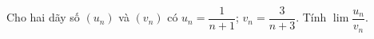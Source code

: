 \begin{ex}
Cho hai dãy số $(u_n)$ và $(v_n)$ có $u_n=\dfrac1{n+1}$; $v_n=\dfrac3{n+3}$. Tính $\lim\dfrac{u_n}{v_n}$.
\loigiai{\sloppy \[\dfrac{u_n}{v_n}=\dfrac{n+3}{3(n+1)}=\dfrac{1+\frac3n}{3\left(1+\frac1n\right)}\to\dfrac13.\]}
\end{ex}
